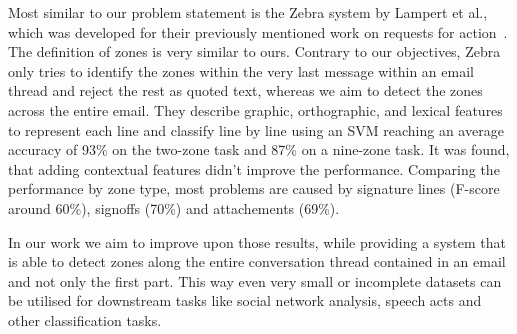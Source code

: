 \documentclass{llncs}
\begin{document}
Most similar to our problem statement is the Zebra system by Lampert et al., which was developed for their previously mentioned work on requests for action~\cite{zones,rfa}.
The definition of zones is very similar to ours.
Contrary to our objectives, Zebra only tries to identify the zones within the very last message within an email thread and reject the rest as quoted text, whereas we aim to detect the zones across the entire email.
They describe graphic, orthographic, and lexical features to represent each line and classify line by line using an SVM reaching an average accuracy of 93\% on the two-zone task and 87\% on a nine-zone task.
It was found, that adding contextual features didn't improve the performance.
Comparing the performance by zone type, most problems are caused by signature lines (F-score around 60\%), signoffs (70\%) and attachements (69\%).

In our work we aim to improve upon those results, while providing a system that is able to detect zones along the entire conversation thread contained in an email and not only the first part.
This way even very small or incomplete datasets can be utilised for downstream tasks like social network analysis, speech acts and other classification tasks.






\end{document}

